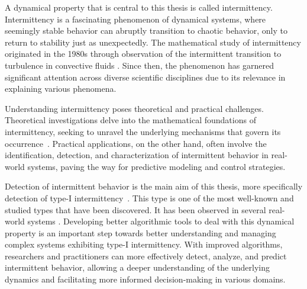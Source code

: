 A dynamical property that is central to this thesis is called intermittency.
Intermittency is a fascinating phenomenon of dynamical systems, where seemingly stable behavior can abruptly transition to chaotic behavior, only to return to stability just as unexpectedly.
The mathematical study of intermittency originated in the 1980s through observation of the intermittent transition to turbulence in convective fluids \cite{Pomeau1980}.
Since then, the phenomenon has garnered significant attention across diverse scientific disciplines due to its relevance in explaining various phenomena.
\par
Understanding intermittency poses theoretical and practical challenges.
Theoretical investigations delve into the mathematical foundations of intermittency, seeking to unravel the underlying mechanisms that govern its occurrence~\cite{Elaskar2017, Elaskar2023}.
Practical applications, on the other hand, often involve the identification, detection, and characterization of intermittent behavior in real-world systems, paving the way for predictive modeling and control strategies.
\par
Detection of intermittent behavior is the main aim of this thesis, more specifically detection of type-I intermittency~\cite{Pomeau1980,Bussac1982,Elaskar2022,DelRio2014}.
This type is one of the most well-known and studied types that have been discovered.
It has been observed in several real-world systems \cite{Zebrowski2004,Parthimos2001,Dimitriu2008,Chiriac20070701}.
Developing better algorithmic tools to deal with this dynamical property is an important step towards better understanding and managing complex systems exhibiting type-I intermittency.
With improved algorithms, researchers and practitioners can more effectively detect, analyze, and predict intermittent behavior, allowing a deeper understanding of the underlying dynamics and facilitating more informed decision-making in various domains.



